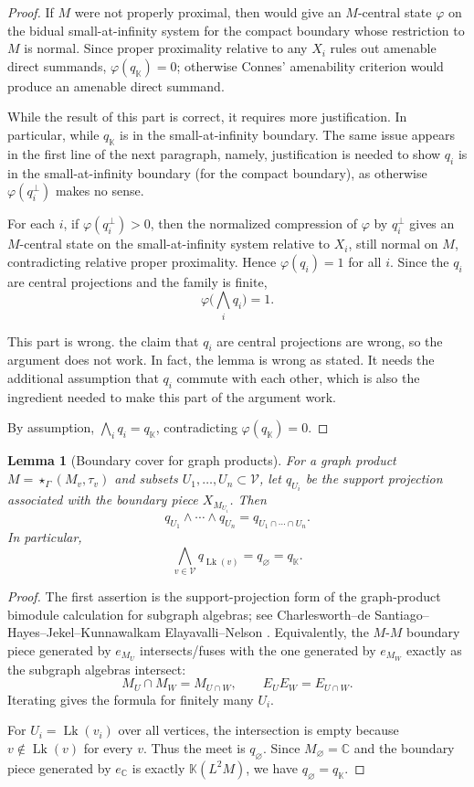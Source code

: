 \documentclass[12pt]{article}
\newtheorem{lemma}[theorem]{Lemma}
\theoremstyle{definition}
\newcommand{\V}{\mathcal V}
\newcommand{\Lk}{\operatorname{Lk}}
\newcommand{\K}{\mathbb K}
\newcommand{\C}{\mathbb C}
\newcommand{\review}[1]{\begin{reviewbox}#1\end{reviewbox}}
\begin{document}
\begin{proof}
If $M$ were not properly proximal, then \cite[Theorem 8.5]{DKEP} would give an $M$-central state $\varphi$ on the bidual small-at-infinity system for the compact boundary whose restriction to $M$ is normal.  Since proper proximality relative to any $X_i$ rules out amenable direct summands, $\varphi(q_{\K})=0$; otherwise Connes' amenability criterion would produce an amenable direct summand.

\review{While the result of this part is correct, it requires more justification. In particular, while $q_\K$ is in the small-at-infinity boundary. The same issue appears in the first line of the next paragraph, namely, justification is needed to show $q_i$ is in the small-at-infinity boundary (for the compact boundary), as otherwise $\varphi(q_i^\perp)$ makes no sense.}

For each $i$, if $\varphi(q_i^\perp)>0$, then the normalized compression of $\varphi$ by $q_i^\perp$ gives an $M$-central state on the small-at-infinity system relative to $X_i$, still normal on $M$, contradicting relative proper proximality.  Hence $\varphi(q_i)=1$ for all $i$.  Since the $q_i$ are central projections and the family is finite,
\[
\varphi\Big(\bigwedge_i q_i\Big)=1.
\]

\review{This part is wrong. the claim that $q_i$ are central projections are wrong, so the argument does not work. In fact, the lemma is wrong as stated. It needs the additional assumption that $q_i$ commute with each other, which is also the ingredient needed to make this part of the argument work.}

By assumption, $\bigwedge_i q_i=q_{\K}$, contradicting $\varphi(q_{\K})=0$.
\end{proof}

\begin{lemma}[Boundary cover for graph products]\label{lem:boundary-cover}
For a graph product $M=\star_{\Gamma}(M_v,\tau_v)$ and subsets $U_1,\dots,U_n\subset \V$, let $q_{U_i}$ be the support projection associated with the boundary piece $X_{M_{U_i}}$.  Then
\[
q_{U_1}\wedge\cdots\wedge q_{U_n}=q_{U_1\cap\cdots\cap U_n}.
\]
In particular,
\[
\bigwedge_{v\in \V} q_{\Lk(v)}=q_\varnothing=q_{\K}.
\]
\end{lemma}

\begin{proof}
The first assertion is the support-projection form of the graph-product bimodule calculation for subgraph algebras; see Charlesworth--de Santiago--Hayes--Jekel--Kunnawalkam Elayavalli--Nelson \cite[Theorem 0.4, Theorem 5.4, and Proposition 5.5]{CDHJKEN}.  Equivalently, the $M$-$M$ boundary piece generated by $e_{M_U}$ intersects/fuses with the one generated by $e_{M_W}$ exactly as the subgraph algebras intersect:
\[
M_U\cap M_W=M_{U\cap W},
\qquad
E_U E_W=E_{U\cap W}.
\]
Iterating gives the formula for finitely many $U_i$.

For $U_i=\Lk(v_i)$ over all vertices, the intersection is empty because $v\notin \Lk(v)$ for every $v$.  Thus the meet is $q_\varnothing$.  Since $M_\varnothing=\C$ and the boundary piece generated by $e_{\C}$ is exactly $\K(L^2M)$, we have $q_\varnothing=q_{\K}$.
\end{proof}
\end{document}
